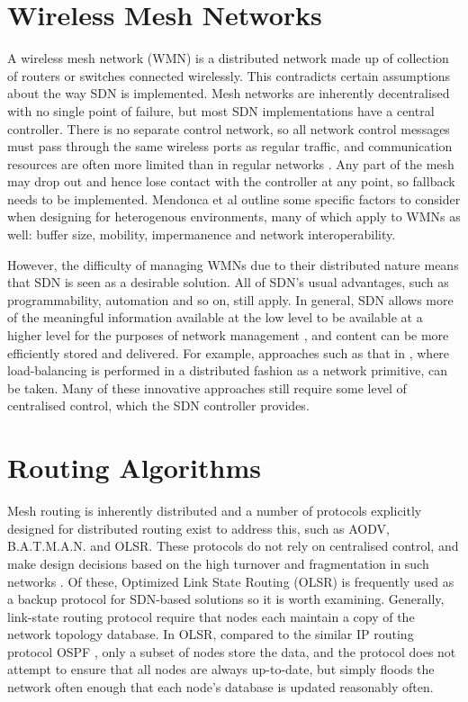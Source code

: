 \section{Wireless Mesh Networks}
A wireless mesh network (WMN) is a distributed network made up of collection of routers or switches connected wirelessly.
This contradicts certain assumptions about the way SDN is implemented. Mesh networks are inherently decentralised with no single point of failure, but most SDN implementations have a central controller. There is no separate control network, so all network control messages must pass through the same wireless ports as regular traffic, and communication resources are often more limited than in regular networks \cite{detti:wmsdn}. Any part of the mesh may drop out and hence lose contact with the controller at any point, so fallback needs to be implemented. Mendonca et al \cite{mendonca:hetero} outline some specific factors to consider when designing for heterogenous environments, many of which apply to WMNs as well: buffer size, mobility, impermanence and network interoperability.

However, the difficulty of managing WMNs due to their distributed nature means that SDN is seen as a desirable solution. All of SDN's usual advantages, such as programmability, automation and so on, still apply. In general, SDN allows more of the meaningful information available at the low level to be available at a higher level for the purposes of network management \cite{mendonca:hetero, dely:wmn}, and content can be more efficiently stored and delivered. For example, approaches such as that in \cite{handigol:asterix}, where load-balancing is performed in a distributed fashion as a network primitive, can be taken. Many of these innovative approaches still require some level of centralised control, which the SDN controller provides.

\section{Routing Algorithms}
Mesh routing is inherently distributed and a number of protocols explicitly designed for distributed routing exist to address this, such as AODV, B.A.T.M.A.N. and OLSR. These protocols do not rely on centralised control, and make design decisions based on the high turnover and fragmentation in such networks \cite{dely:wmn, detti:wmsdn}. Of these, Optimized Link State Routing (OLSR) \cite{rfc3626} is frequently used as a backup protocol for SDN-based solutions so it is worth examining. Generally, link-state routing protocol require that nodes each maintain a copy of the network topology database. In OLSR, compared to the similar IP routing protocol OSPF \cite{rfc5340}, only a subset of nodes store the data, and the protocol does not attempt to ensure that all nodes are always up-to-date, but simply floods the network often enough that each node's database is updated reasonably often.

